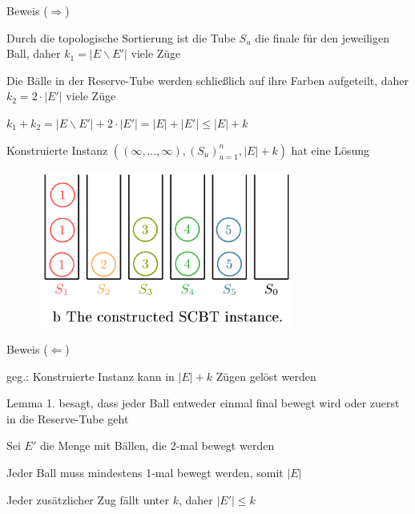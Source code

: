 \documentclass{beamer}
\begin{document}
\begin{frame}{Beweis (\glqq $\Rightarrow$\grqq)}
\begin{pointlist}
\item Durch die topologische Sortierung ist die Tube $S_u$ die finale für den jeweiligen Ball, daher $k_1 = |E\backslash E'|$ viele Züge
\item Die Bälle in der Reserve-Tube werden schließlich auf ihre Farben aufgeteilt, daher $k_2 = 2\cdot |E'|$ viele Züge
\item $k_1 + k_2 =  |E\backslash E'| + 2\cdot |E'| = |E| + |E'| \leq |E| + k$
\item Konstruierte Instanz $((\infty, \dots, \infty), (S_u)_{u=1}^n, |E|+k)$ hat eine Lösung
\end{pointlist}
\begin{figure}
    \centering
    \includegraphics[width=0.75\textwidth]{proofr5}
\end{figure}
\end{frame}

\begin{frame}{Beweis (\glqq $\Leftarrow$\grqq)}
\begin{pointlist}
\item geg.: Konstruierte Instanz kann in $|E|+k$ Zügen gelöst werden
\item Lemma 1. besagt, dass jeder Ball entweder einmal final bewegt wird oder zuerst in die Reserve-Tube geht
\item Sei $E'$ die Menge mit Bällen, die 2-mal bewegt werden
\item Jeder Ball muss mindestens 1-mal bewegt werden, somit $|E|$
\item Jeder zusätzlicher Zug fällt unter $k$, daher $|E'|\leq k$
\end{pointlist}
\end{frame}
\end{document}
